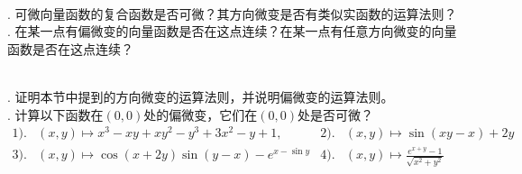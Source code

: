 \documentclass[12pt,UTF8]{ctexbook}
\begin{document}
\begin{sk}
    \mbox{} \\
    . 可微向量函数的复合函数是否可微？其方向微变是否有类似实函数的运算法则？\\
    . 在某一点有偏微变的向量函数是否在这点连续？在某一点有任意方向微变的向量函数是否在这点连续？
\end{sk}

\begin{xt}
    \mbox{} \\
    . 证明本节中提到的方向微变的运算法则，并说明偏微变的运算法则。\\
    . 
    计算以下函数在$(0,0)$处的偏微变，它们在$(0,0)$处是否可微？
    \begin{align*}
        1).& (x,y) \mapsto x^3 - xy + xy^2 - y^3 + 3x^2 - y + 1,  &2).& (x,y) \mapsto \sin{(xy - x)} + 2y \\
        3).& (x,y) \mapsto \cos{(x + 2y)}\sin{(y - x)}  - e^{x - \sin{y}}   & 4).& (x,y) \mapsto \displaystyle\frac{e^{x + y} - 1}{\sqrt{x^2 + y^2}}
    \end{align*}
\end{xt}


\end{document}
